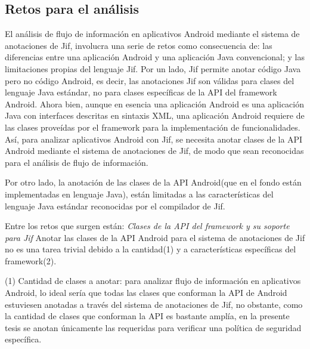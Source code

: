 \subsection{Retos para el análisis}
El análisis de flujo de información en aplicativos Android mediante el sistema
de anotaciones de Jif, involucra una serie de retos como consecuencia de: las
diferencias entre una aplicación Android y una aplicación Java convencional; y
las limitaciones propias del lenguaje Jif.\newline 
Por un lado, Jif permite anotar código Java pero no código Android, es decir,
las anotaciones Jif son válidas para clases del lenguaje Java estándar, no para
clases específicas de la API del framework Android.\newline 
Ahora bien, aunque en esencia una aplicación Android es una aplicación Java con
interfaces descritas en sintaxis XML, una aplicación Android requiere de las
clases proveídas por el framework para la implementación de
funcionalidades.\newline 
Así, para analizar aplicativos Android con Jif, se
necesita anotar clases de la API Android mediante el sistema de anotaciones de Jif, de modo que sean
reconocidas para el análisis de flujo de información. 

Por otro lado, la anotación de las clases de la API Android(que en el fondo
están implementadas en lenguaje Java), están limitadas a las características del
lenguaje Java estándar reconocidas por el compilador de Jif.

Entre los retos que surgen están:\newline 
\emph{Clases de la API del framework y su soporte para Jif}\newline 
Anotar las clases de la API Android para el sistema de anotaciones de Jif no
es una tarea trivial debido a la cantidad(1) y a características específicas
del framework(2).

(1) Cantidad de clases a anotar: para analizar flujo de información en
aplicativos Android, lo ideal sería que todas las clases que conforman la API de
Android estuviesen anotadas a través del sistema de anotaciones de Jif, no
obstante, como la cantidad de clases que conforman la API es bastante amplía, en
la presente tesis se anotan únicamente las requeridas para verificar una
política de seguridad específica.
 
